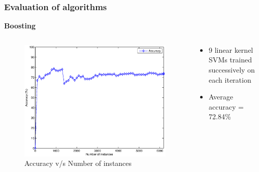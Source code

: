 \documentclass{beamer}
\begin{document}
    \begin{frame}
        \frametitle{Evaluation of algorithms}
        \begin{center}
            \textbf{Boosting}
        \end{center}
        \begin{columns}
            \begin{column}{0.5\textwidth}
                \begin{figure}
                    \centering
                    \includegraphics[width=\textwidth]{figures/boosting_accuracy.eps}
                    \caption{Accuracy v/s Number of instances}
                \end{figure}
            \end{column}
            \begin{column}{0.5\textwidth}
                \begin{itemize}
                    \item{9 linear kernel SVMs trained successively on each iteration}
                    \item{Average accuracy = 72.84\%}
                \end{itemize}
            \end{column}
        \end{columns}
    \end{frame}
    
\end{document}
